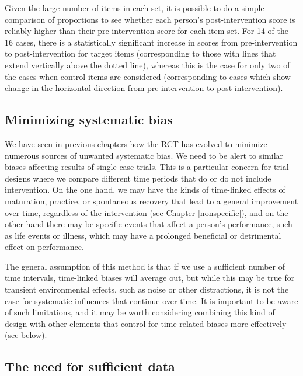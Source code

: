\documentclass{krantz}
\begin{document}
Given the large number of items in each set, it is possible to do a simple comparison of proportions to see whether each person's post-intervention score is reliably higher than their pre-intervention score for each item set. For 14 of the 16 cases, there is a statistically significant increase in scores from pre-intervention to post-intervention for target items (corresponding to those with lines that extend vertically above the dotted line), whereas this is the case for only two of the cases when control items are considered (corresponding to cases which show change in the horizontal direction from pre-intervention to post-intervention).

\hypertarget{minimising-systematic-bias}{%
\subsection{Minimizing systematic bias}\label{minimising-systematic-bias}}

We have seen in previous chapters how the RCT has evolved to minimize numerous sources of unwanted systematic bias. We need to be alert to similar biases affecting results of single case trials. This is a particular concern for trial designs where we compare different time periods that do or do not include intervention. On the one hand, we may have the kinds of time-linked effects of maturation, practice, or spontaneous recovery that lead to a general improvement over time, regardless of the intervention (see Chapter \ref{nonspecific}), and on the other hand there may be specific events that affect a person's performance, such as life events or illness, which may have a prolonged beneficial or detrimental effect on performance.

The general assumption of this method is that if we use a sufficient number of time intervals, time-linked biases will average out, but while this may be true for transient environmental effects, such as noise or other distractions, it is not the case for systematic influences that continue over time. It is important to be aware of such limitations, and it may be worth considering combining this kind of design with other elements that control for time-related biases more effectively (see below).

\hypertarget{the-need-for-sufficient-data}{%
\subsection{The need for sufficient data}\label{the-need-for-sufficient-data}}
\end{document}

